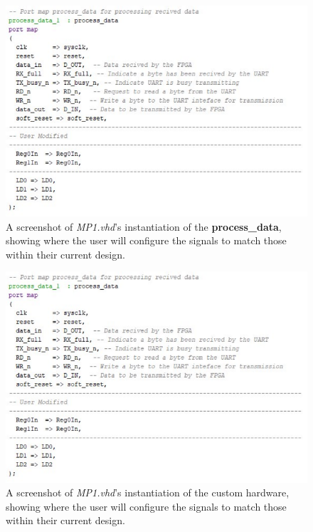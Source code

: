 \begin{figure}[H]
	\begin{center}
	\includegraphics[scale=0.5]{fig/r2u2_hw_mp1_inst.pdf}
	\caption{A screenshot of \textit{MP1.vhd}'s instantiation of the \textbf{process\_data}, showing where the user will configure the signals to match those within their current design.
	\label{fig:r2u2hwMP1Inst}} 
	\end{center}
\end{figure}

\begin{figure}[H]
	\begin{center}
	\includegraphics[scale=0.5]{fig/r2u2_hw_mp1_custom_inst.pdf}
	\caption{A screenshot of \textit{MP1.vhd}'s instantiation of the custom hardware, showing where the user will configure the signals to match those within their current design.
	\label{fig:r2u2hwMP1customInst}} 
	\end{center}
\end{figure}


